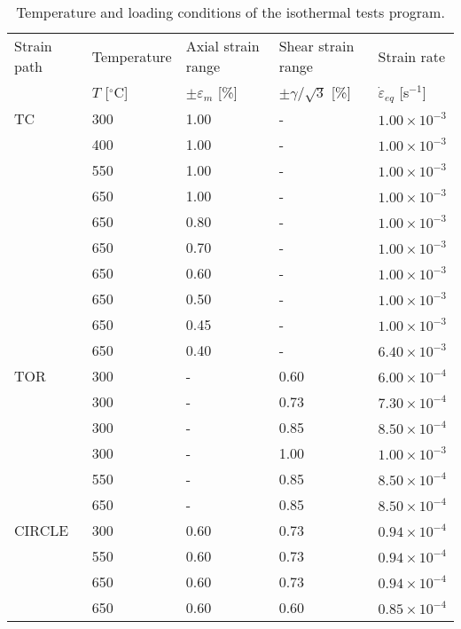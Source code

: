 \begin{table}[htbp]
  \centering
  \caption{Temperature and loading conditions of the isothermal tests program.}
    \begin{tabular}{lllll}
    \toprule
    Strain path & Temperature & Axial strain range & Shear strain range & Strain rate \\
          & $T$ [$^\circ$C] & $\pm \varepsilon _m$ [\%] & $\pm \gamma/ \sqrt 3$ [\%] & $\dot \varepsilon _{eq}$ [s$^{-1}$] \\
    \midrule
    TC    & 300   & 1.00  & -     & $1.00\times 10^{-3}$ \\
          & 400   & 1.00  & -     & $1.00\times 10^{-3}$ \\
          & 550   & 1.00  & -     & $1.00\times 10^{-3}$ \\
          & 650   & 1.00  & -     & $1.00\times 10^{-3}$ \\
          & 650   & 0.80  & -     & $1.00\times 10^{-3}$ \\
          & 650   & 0.70  & -     & $1.00\times 10^{-3}$ \\
          & 650   & 0.60  & -     & $1.00\times 10^{-3}$ \\
          & 650   & 0.50  & -     & $1.00\times 10^{-3}$ \\
          & 650   & 0.45  & -     & $1.00\times 10^{-3}$ \\
          & 650   & 0.40  & -     & $6.40\times 10^{-3}$ \\
    \midrule
    TOR   & 300   & -     & 0.60  & $6.00\times 10^{-4}$ \\
          & 300   & -     & 0.73  & $7.30\times 10^{-4}$ \\
          & 300   & -     & 0.85  & $8.50\times 10^{-4}$ \\
          & 300   & -     & 1.00  & $1.00\times 10^{-3}$ \\
          & 550   & -     & 0.85  & $8.50\times 10^{-4}$ \\
          & 650   & -     & 0.85  & $8.50\times 10^{-4}$ \\
    \midrule
    CIRCLE & 300   & 0.60  & 0.73  & $0.94\times 10^{-4}$ \\
          & 550   & 0.60  & 0.73  & $0.94\times 10^{-4}$ \\
          & 650   & 0.60  & 0.73  & $0.94\times 10^{-4}$ \\
          & 650   & 0.60  & 0.60  & $0.85\times 10^{-4}$ \\

\end{tabular}
\end{table}
